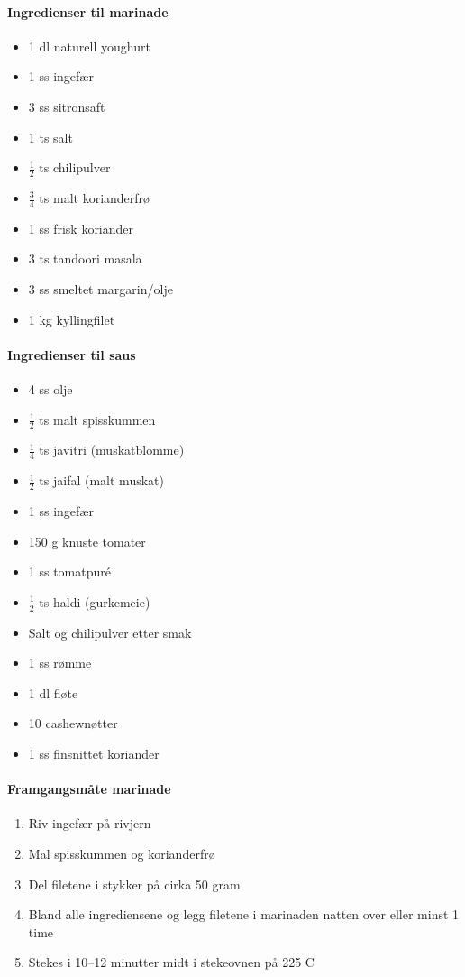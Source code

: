 \documentclass[12pt,a4paper]{book}
\begin{document}
{\paragraph{Ingredienser til marinade}
\begin{itemize}[noitemsep]
	\item 1 dl naturell youghurt
	\item 1 ss ingefær
	\item 3 ss sitronsaft
	\item 1 ts salt
	\item $\frac{1}{2}$ ts chilipulver
	\item $\frac{3}{4}$ ts malt korianderfrø
	\item 1 ss frisk koriander
	\item 3 ts tandoori masala
	\item 3 ss smeltet margarin/olje
	\item 1 kg kyllingfilet
\end{itemize}

\paragraph{Ingredienser til saus}
\begin{itemize}[noitemsep]
	\item 4 ss olje
	\item  $\frac{1}{2}$ ts malt spisskummen
	\item $\frac{1}{4}$ ts javitri (muskatblomme)
	\item  $\frac{1}{2}$ ts jaifal (malt muskat)
	\item 1 ss ingefær
	\item 150 g knuste tomater
	\item 1 ss tomatpuré
	\item  $\frac{1}{2}$ ts haldi (gurkemeie)
	\item Salt og chilipulver etter smak
	\item 1 ss rømme
	\item 1 dl fløte
	\item 10 cashewnøtter
	\item 1 ss finsnittet koriander
\end{itemize}

\paragraph{Framgangsmåte marinade}
\begin{enumerate}[noitemsep]
	\item Riv ingefær på rivjern 
	\item Mal spisskummen og korianderfrø
	\item Del filetene i stykker på cirka 50 gram
	\item Bland alle ingrediensene og legg filetene i marinaden natten over eller minst 1 time
	\item Stekes i 10--12 minutter midt i stekeovnen på 225 \degree C
\end{enumerate}

}
\end{document}
